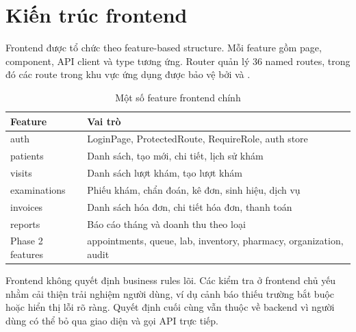 


\section{Kiến trúc frontend}

Frontend được tổ chức theo feature-based structure. Mỗi feature gồm page, component, API client và type tương ứng. Router quản lý 36 named routes, trong đó các route trong khu vực ứng dụng được bảo vệ bởi  và .

\begin{table}[H]
\centering
\caption{Một số feature frontend chính}
\begin{tabularx}{\textwidth}{|p{4cm}|X|}
\hline
\textbf{Feature} & \textbf{Vai trò} \\
\hline
auth & LoginPage, ProtectedRoute, RequireRole, auth store \\
\hline
patients & Danh sách, tạo mới, chi tiết, lịch sử khám \\
\hline
visits & Danh sách lượt khám, tạo lượt khám \\
\hline
examinations & Phiếu khám, chẩn đoán, kê đơn, sinh hiệu, dịch vụ \\
\hline
invoices & Danh sách hóa đơn, chi tiết hóa đơn, thanh toán \\
\hline
reports & Báo cáo tháng và doanh thu theo loại \\
\hline
Phase 2 features & appointments, queue, lab, inventory, pharmacy, organization, audit \\
\hline
\end{tabularx}
\end{table}
\noindent
Frontend không quyết định business rules lõi. Các kiểm tra ở frontend chủ yếu nhằm cải thiện trải nghiệm người dùng, ví dụ cảnh báo thiếu trường bắt buộc hoặc hiển thị lỗi rõ ràng. Quyết định cuối cùng vẫn thuộc về backend vì người dùng có thể bỏ qua giao diện và gọi API trực tiếp.

